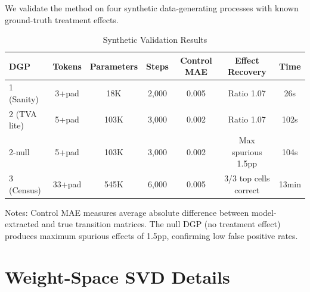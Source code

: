 \documentclass[12pt]{article}
\begin{document}
We validate the method on four synthetic data-generating processes with known ground-truth treatment effects.

\begin{table}[H]
\centering
\caption{Synthetic Validation Results}
\label{tab:synthetic}
\begin{threeparttable}
\begin{tabular}{lcccccc}
\toprule
DGP & Tokens & Parameters & Steps & Control MAE & Effect Recovery & Time \\
\midrule
1 (Sanity) & 3+pad & 18K & 2,000 & 0.005 & Ratio 1.07 & 26s \\
2 (TVA lite) & 5+pad & 103K & 3,000 & 0.002 & Ratio 1.07 & 102s \\
2-null & 5+pad & 103K & 3,000 & 0.002 & Max spurious 1.5pp & 104s \\
3 (Census) & 33+pad & 545K & 6,000 & 0.005 & 3/3 top cells correct & 13min \\
\bottomrule
\end{tabular}
\begin{tablenotes}[flushleft]
\small
\item Notes: Control MAE measures average absolute difference between model-extracted and true transition matrices. The null DGP (no treatment effect) produces maximum spurious effects of 1.5pp, confirming low false positive rates.
\end{tablenotes}
\end{threeparttable}
\end{table}


\section{Weight-Space SVD Details}
\label{app:svd}
\end{document}
